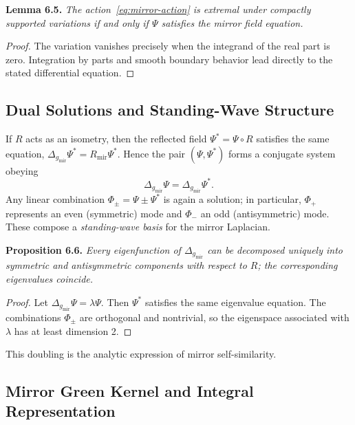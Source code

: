 \noindent
\textbf{Lemma 6.5.}
\emph{The action~\eqref{eq:mirror-action}
is extremal under compactly supported variations
if and only if \(\Psi\) satisfies the mirror field equation.}

\begin{proof}
The variation vanishes precisely when the integrand of the real part is zero.
Integration by parts and smooth boundary behavior
lead directly to the stated differential equation.
\end{proof}

\subsection{Dual Solutions and Standing-Wave Structure}\relax \hspace{0pt}

If \(R\) acts as an isometry,
then the reflected field \(\Psi^{*}=\Psi\circ R\)
satisfies the same equation,
\(\Delta_{g_{\mathrm{mir}}}\Psi^{*}=R_{\mathrm{mir}}\Psi^{*}\).
Hence the pair \((\Psi,\Psi^{*})\)
forms a conjugate system obeying
\[
\Delta_{g_{\mathrm{mir}}}\Psi=\Delta_{g_{\mathrm{mir}}}\Psi^{*}.
\]
Any linear combination
\(\Phi_{\pm}=\Psi\pm\Psi^{*}\)
is again a solution; in particular,
\(\Phi_{+}\) represents an even (symmetric) mode
and \(\Phi_{-}\) an odd (antisymmetric) mode.
These compose a \emph{standing-wave basis}
for the mirror Laplacian.

\noindent
\textbf{Proposition 6.6.}
\emph{Every eigenfunction of \(\Delta_{g_{\mathrm{mir}}}\)
can be decomposed uniquely into symmetric and antisymmetric components
with respect to \(R\);
the corresponding eigenvalues coincide.}

\begin{proof}
Let \(\Delta_{g_{\mathrm{mir}}}\Psi=\lambda\Psi\).
Then \(\Psi^{*}\) satisfies the same eigenvalue equation.
The combinations \(\Phi_{\pm}\) are orthogonal and nontrivial,
so the eigenspace associated with \(\lambda\)
has at least dimension 2.
\end{proof}
This doubling is the analytic expression of mirror self-similarity. %

\subsection{Mirror Green Kernel and Integral Representation}\relax \hspace{0pt}

